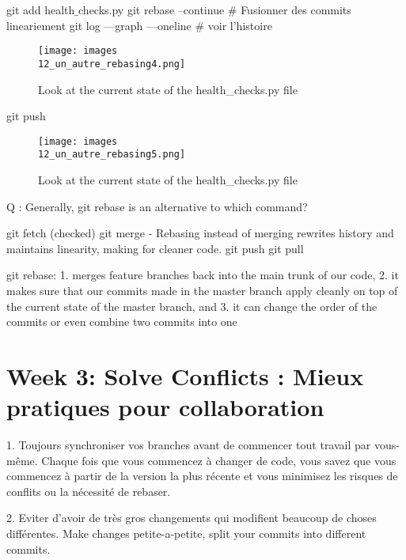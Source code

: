 \documentclass[11pt, onecolumn]{article}
\begin{document}
git add health$\_$checks.py
git rebase --continue       # Fusionner des commits lineariement
git log —graph —oneline     # voir l'histoire

\begin{figure}[h]
\begin{center}
\texttt{[image: images\\12\_un\_autre\_rebasing4.png]}
\end{center}
\caption{Look at the current state of the health_checks.py file}
\label{12_un_autre_rebasing4}
\end{figure}

git push

\begin{figure}[h]
\begin{center}
\texttt{[image: images\\12\_un\_autre\_rebasing5.png]}
\end{center}
\caption{Look at the current state of the health_checks.py file}
\label{12_un_autre_rebasing5}
\end{figure}


Q : Generally, git rebase is an alternative to which command?

git fetch
(checked) git merge  - Rebasing instead of merging rewrites history and maintains linearity, making for cleaner code.
git push
git pull


git rebase: 1. merges feature branches back into the main trunk of our code, 2. it makes sure that our commits made in the master branch apply cleanly on top of the current state of the master branch, and 3. it can change the order of the commits or even combine two commits into one


\section{Week 3: Solve Conflicts : Mieux pratiques pour collaboration}

1. Toujours synchroniser vos branches avant de commencer tout travail par vous-même. 
Chaque fois que vous commencez à changer de code, vous savez que vous commencez à partir de la version la plus récente et vous minimisez les risques de conflits ou la nécessité de rebaser. 

2. Eviter d'avoir de très gros changements qui modifient beaucoup de choses différentes. Make changes petite-a-petite, split your commits into different commits. 
\end{document}
